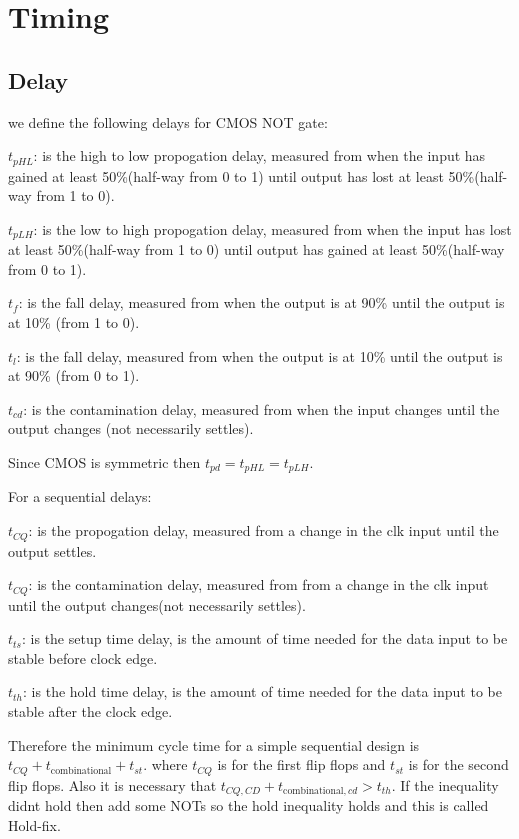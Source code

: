 \chapter{Timing}
\section{Delay}
we define the following delays for CMOS NOT gate:
\begin{definition}
    \item [\(t_{pHL}\):] is the high to low propogation delay, measured from when the input has gained at least 50\%(half-way from 0 to 1) until output has lost at least 50\%(half-way from 1 to 0).
    \item [\(t_{pLH}\):] is the low to high propogation delay, measured from when the input has lost at least 50\%(half-way from 1 to 0) until output has gained at least 50\%(half-way from 0 to 1).
    \item [\(t_{f}\):] is the fall delay, measured from when the output is at 90\% until the output is at 10\% (from 1 to 0).
    \item [\(t_{l}\):] is the fall delay, measured from when the output is at 10\% until the output is at 90\% (from 0 to 1).
    \item [\(t_{cd}\):] is the contamination delay, measured from when the input changes until the output changes (not necessarily settles).
\end{definition}
Since CMOS is symmetric then \(t_{pd} = t_{pHL} = t_{pLH}\).

For a sequential delays:
\begin{definition}
    \item [\(t_{CQ}\):] is the propogation delay, measured from a change in the clk input until the output settles.
    \item [\(t_{CQ}\):] is the contamination delay, measured from from a change in the clk input until the output changes(not necessarily settles).
    \item [\(t_{ts}\):] is the setup time delay, is the amount of time needed for the data input to be stable before clock edge.
    \item [\(t_{th}\):] is the hold time delay, is the amount of time needed for the data input to be stable after the clock edge.
\end{definition}
Therefore the minimum cycle time for a simple sequential design is \(t_{CQ} + t_{\text{combinational}} + t_{st}\). where \(t_{CQ}\) is for the first flip flops and \(t_{st}\) is for the second flip flops. Also it is necessary that \(t_{CQ,CD} + t_{\text{combinational},cd} > t_{th}\). If the inequality didnt hold then add some NOTs so the hold inequality holds and this is called Hold-fix.

